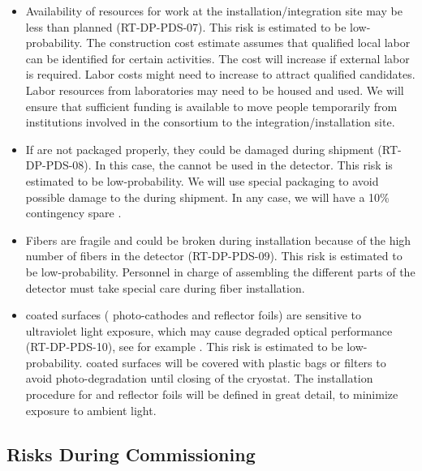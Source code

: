 \begin{itemize}

\item Availability of resources for work at the installation/integration site may be less than planned (RT-DP-PDS-07). This risk is estimated to be low-probability. The  construction cost estimate assumes that qualified local labor can be identified for certain activities.  The cost will increase if external labor is required.  Labor costs might need to increase to attract qualified candidates. Labor resources from laboratories may need to be housed and used. We will ensure that sufficient funding is available to move people temporarily from institutions involved in the  consortium to the integration/installation site.

\item If  are not packaged properly, they could be damaged during shipment (RT-DP-PDS-08). In this case, the  cannot be used in the detector. This risk is estimated to be low-probability. We will use special packaging to avoid possible damage to the  during shipment. In any case, we will have a \num{10}\% contingency spare .

\item Fibers are fragile and could be broken during installation because of the high number of fibers in the detector (RT-DP-PDS-09). This risk is estimated to be low-probability. Personnel in charge of assembling the different parts of the detector must take special care during fiber installation.

\item {} coated surfaces ( photo-cathodes and  reflector foils) are sensitive to ultraviolet light exposure, which may cause degraded optical performance (RT-DP-PDS-10), see for example \cite{Jones:2012hm}. This risk is estimated to be low-probability.  coated surfaces will be covered with plastic bags or filters to avoid photo-degradation until closing of the cryostat. The installation procedure for  and  reflector foils will be defined in great detail, to minimize exposure to ambient light. 

\end{itemize}


\subsection{Risks During Commissioning}
\label{sec:dp-pds-risks_commissioning}

